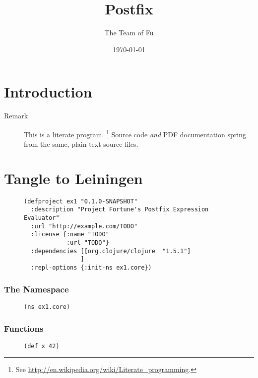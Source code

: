 \documentclass[11pt]{article}
\author{The Team of Fu}
\date{\today}
\title{Postfix}
\begin{document}
\maketitle
\tableofcontents


\section{Introduction}
\label{sec-1}
\begin{description}
\item[{Remark}] This is a literate program.
\footnote{See \url{http://en.wikipedia.org/wiki/Literate_programming}.}
Source code \emph{and} PDF documentation spring
from the same, plain-text source files.
\end{description}
\section{Tangle to Leiningen}
\label{sec-2}

\begin{figure}[H]
\label{project-file}
\begin{verbatim}
(defproject ex1 "0.1.0-SNAPSHOT"
  :description "Project Fortune's Postfix Expression Evaluator"
  :url "http://example.com/TODO"
  :license {:name "TODO"
            :url "TODO"}
  :dependencies [[org.clojure/clojure  "1.5.1"]
                ]
  :repl-options {:init-ns ex1.core})
\end{verbatim}
\end{figure}

\subsubsection{The Namespace}
\label{sec-2-0-1}

\begin{figure}[H]
\label{main-namespace}
\begin{verbatim}
(ns ex1.core)
\end{verbatim}
\end{figure}
\subsubsection{Functions}
\label{sec-2-0-2}

\begin{figure}[H]
\label{main-functions}
\begin{verbatim}
(def x 42)
\end{verbatim}
\end{figure}
\end{document}
